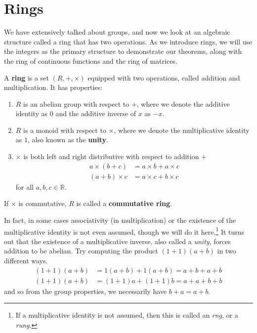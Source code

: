 \section{Rings} 

  We have extensively talked about groups, and now we look at an algebraic structure called a ring that has two operations. As we introduce rings, we will use the integers as the primary structure to demonstrate our theorems, along with the ring of continuous functions and the ring of matrices. 

  \begin{definition}[Ring]
    A \textbf{ring} is a set $(R, +, \times)$ equipped with two operations, called addition and multiplication. It has properties: 
    \begin{enumerate}
      \item $R$ is an abelian group with respect to $+$, where we denote the additive identity as $0$ and the additive inverse of $x$ as $-x$. 
      \item $R$ is a monoid with respect to $\times$, where we denote the multiplicative identity as $1$, also known as the \textbf{unity}. 
      \item $\times$ is both left and right distributive with respect to addition $+$
      \begin{align}
        a \times (b + c) & = a\times b + a\times c \\ 
        (a + b) \times c & = a\times c + b\times c 
      \end{align}
      for all $a, b, c \in \mathbb{R}$. 
    \end{enumerate} 
    If $\times$ is commutative, $R$ is called a \textbf{commutative ring}. 
  \end{definition}

  In fact, in some cases associativity (in multiplication) or the existence of the multiplicative identity is not even assumed, though we will do it here.\footnote{If a multiplicative identity is not assumed, then this is called an \textit{rng}, or a \textit{rung}.} It turns out that the existence of a multiplicative inverse, also called a \textit{unity}, forces addition to be abelian. Try computing the product $(1 + 1)(a + b)$ in two different ways. 
  \begin{align}
    (1 + 1)(a + b) & = 1(a + b) + 1(a + b) = a + b + a + b \\
    (1 + 1)(a + b) & = (1 + 1)a + (1 + 1)b = a + a + b + b
  \end{align}
  and so from the group properties, we necessarily have $b + a = a + b$. 

